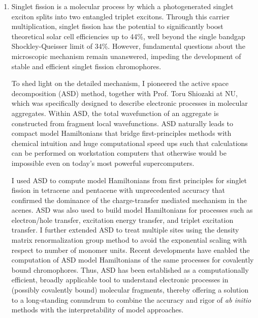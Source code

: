 \documentclass{nihbiosketch}
\begin{document}
\begin{enumerate}
  \begin{bibunit}[nih]
    \renewcommand{\refname}{\vspace{-2em}}
    \nocite{Parker2011JCP224301,Parker2012MolPhys1941,Parker2014NanoLett4587}
  \end{bibunit}

  \item
  Singlet fission\cite{Smith2010ChemRev} is a molecular process by which a photogenerated singlet exciton
  splits into two entangled triplet excitons. Through this carrier multiplication, singlet fission has
  the potential to significantly boost theoretical solar cell efficiencies up to 44\%, well beyond the
  single bandgap Shockley-Queisser limit
  of 34\%.\cite{Hanna2006JAP,Smith2010ChemRev} However, fundamental questions about the microscopic
  mechanism remain unanswered, impeding the development of stable and efficient singlet fission chromophores.

  To shed light on the detailed mechanism, I pioneered the active space decomposition (ASD) method, together
  with Prof. Toru Shiozaki at NU, which was specifically designed to describe electronic processes
  in molecular aggregates.\cite{Parker2013JCP} Within ASD, the total wavefunction of an aggregate is
  constructed from fragment local wavefunctions.\cite{Parker2013JCP} ASD naturally leads to
  compact model Hamiltonians that bridge first-principles methods with chemical intuition and huge
  computational speed ups such that calculations can be performed on workstation computers
  that otherwise would be impossible even on today's most powerful supercomputers.

  I used ASD to compute model Hamiltonians from first principles for singlet fission in tetracene and pentacene
  with unprecedented accuracy that confirmed the dominance of the charge-transfer mediated mechanism
  in the acenes.\cite{Parker2014JPCC}
  ASD was also used to build model Hamiltonians
  for processes such as electron/hole transfer, excitation energy transfer, and triplet excitation transfer.\cite{Parker2014JCTC}
  I further extended ASD to treat multiple sites using the density matrix renormalization group method
  to avoid the exponential scaling with respect to number of monomer units.\cite{Parker2014JCP}
  Recent developments have enabled the computation of ASD model Hamiltonians of the same processes
  for covalently bound chromophores.\cite{Kim2015JCTC}
  Thus, ASD has been established as a computationally efficient, broadly applicable tool to understand
  electronic processes in (possibly covalently bound) molecular fragments, thereby offering a solution
  to a long-standing conundrum to combine the accuracy and rigor of \textit{ab initio} methods with
  the interpretability of model approaches.


\end{enumerate}
\end{document}
